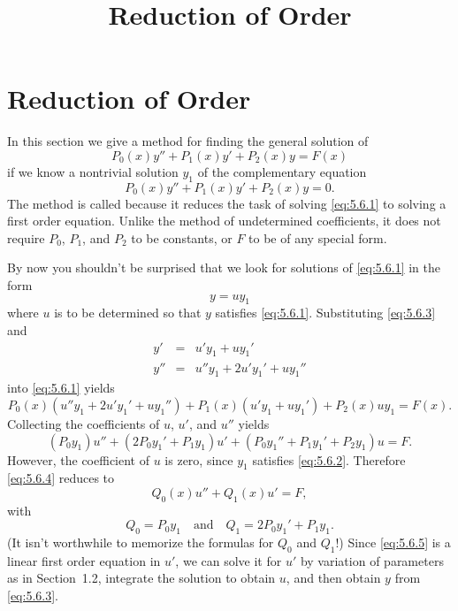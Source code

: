 \documentclass{ximera}
\title{Reduction of Order}
\begin{document}
\begin{abstract}

\end{abstract}

\maketitle

\section*{Reduction of Order}

In this section we give a method for finding the general
solution of
\begin{equation} \label{eq:5.6.1}
P_0(x)y''+P_1(x)y'+P_2(x)y=F(x)
\end{equation}
if we know  a nontrivial solution $y_1$ of the complementary equation
\begin{equation} \label{eq:5.6.2}
P_0(x)y''+P_1(x)y'+P_2(x)y=0.
\end{equation}
The method is called  because it reduces
the task of solving \eqref{eq:5.6.1} to solving a first order equation.
Unlike the method of undetermined coefficients, it does not require
$P_0$, $P_1$, and $P_2$ to be constants, or $F$ to be of any special
form.

By now you shouldn't be surprised that we look for
solutions of \eqref{eq:5.6.1} in the form
\begin{equation} \label{eq:5.6.3}
y=uy_1
\end{equation}
where $u$ is to be determined so that $y$ satisfies \eqref{eq:5.6.1}.
Substituting \eqref{eq:5.6.3} and
$$\begin{array}{rcl}
y'&=& u'y_1+uy_1' \\
y''&=& u''y_1+2u'y_1'+uy_1''
\end{array}$$
into \eqref{eq:5.6.1} yields
$$
P_0(x)(u''y_1+2u'y_1'+uy_1'')+P_1(x)(u'y_1+uy_1')+P_2(x)uy_1=F(x).
$$
Collecting the coefficients of $u$, $u'$, and $u''$ yields
\begin{equation} \label{eq:5.6.4}
(P_0y_1)u''+(2P_0y_1'+P_1y_1)u'+(P_0y_1''+P_1y_1'+P_2y_1)
u=F.
\end{equation}
However, the coefficient of $u$ is zero, since $y_1$ satisfies
\eqref{eq:5.6.2}. Therefore \eqref{eq:5.6.4} reduces to
\begin{equation} \label{eq:5.6.5}
Q_0(x)u''+Q_1(x)u'=F,
\end{equation}
with
$$
Q_0=P_0y_1 \quad\mbox{and}\quad Q_1=2P_0y_1'+P_1y_1.
$$
(It isn't worthwhile to memorize the formulas for $Q_0$ and $Q_1$!)
Since \eqref{eq:5.6.5} is a linear first order equation in $u'$, we can
solve it for $u'$ by variation of parameters as in
Section~1.2, integrate the solution to obtain $u$, and then
obtain $y$ from \eqref{eq:5.6.3}.
\end{document}
